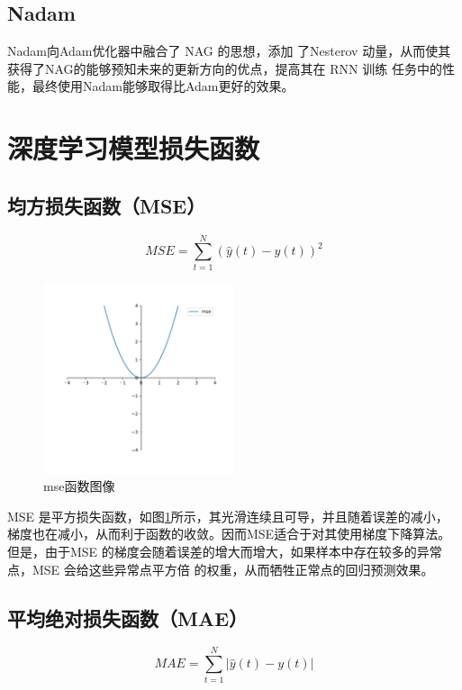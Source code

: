 \documentclass[AutoFakeBold]{LZUThesis}
\begin{document}
\subsection{Nadam}
Nadam\cite{dozat2016incorporating}向Adam优化器中融合了 NAG 的思想，添加
了Nesterov 动量，从而使其获得了NAG的能够预知未来的更新方向的优点，提高其在 RNN 训练
任务中的性能，最终使用Nadam能够取得比Adam更好的效果。

\section{深度学习模型损失函数}
\subsection{均方损失函数（MSE）}
$$MSE=\sum_{t=1}^{N}\left(\hat{y}\left(t\right)-y\left(t\right)\right)^2$$

\begin{figure}[H]
	\centering
    \includegraphics[width=0.5\textwidth]{figures/mse.pdf}
    \caption{mse函数图像}
    \label{fig_mse}
\end{figure}

MSE 是平方损失函数，如图\ref{fig_mse}所示，其光滑连续且可导，并且随着误差的减小，
梯度也在减小，从而利于函数的收敛。因而MSE适合于对其使用梯度下降算法。但是，由于MSE
的梯度会随着误差的增大而增大，如果样本中存在较多的异常点，MSE 会给这些异常点平方倍
的权重，从而牺牲正常点的回归预测效果。

\subsection{平均绝对损失函数（MAE）}
$$MAE=\sum_{t=1}^{N}\left|\hat{y}\left(t\right)-y\left(t\right)\right|$$
\end{document}
